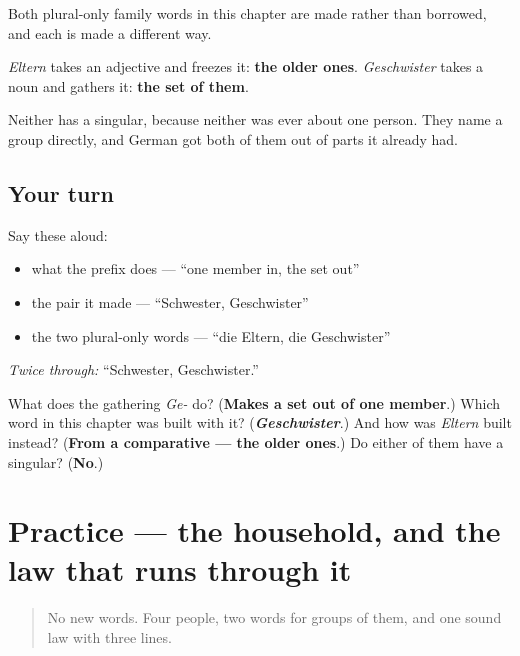 \begin{culture}
Both plural-only family words in this chapter are made rather than borrowed, and each is made a different way.

\emph{Eltern} takes an adjective and freezes it: \textbf{the older ones}. \emph{Geschwister} takes a noun and gathers it: \textbf{the set of them}.

Neither has a singular, because neither was ever about one person. They name a group directly, and German got both of them out of parts it already had.
\end{culture}

\subsection*{Your turn}
Say these aloud:

\begin{itemize}
\raggedright
  \item what the prefix does — \textquotedblleft{}one member in, the set out\textquotedblright{}
  \item the pair it made — \textquotedblleft{}Schwester, Geschwister\textquotedblright{}
  \item the two plural-only words — \textquotedblleft{}die Eltern, die Geschwister\textquotedblright{}
\end{itemize}

\emph{Twice through:} \textquotedblleft{}Schwester, Geschwister.\textquotedblright{}

\begin{tcolorbox}[breakable,colback=teal!4,colframe=teal!35!black,title={Before you move on}]
What does the gathering \emph{Ge-} do? (\textbf{Makes a set out of one member}.) Which word in this chapter was built with it? (\emph{\textbf{Geschwister}}.) And how was \emph{Eltern} built instead? (\textbf{From a comparative — the older ones}.) Do either of them have a singular? (\textbf{No}.)
\end{tcolorbox}
\section[Practice]{Practice — the household, and the law that runs through it}

\label{lesson:GE-C10-geschwister}



\begin{quote}
No new words. Four people, two words for groups of them, and one sound law with three lines.
\end{quote}

